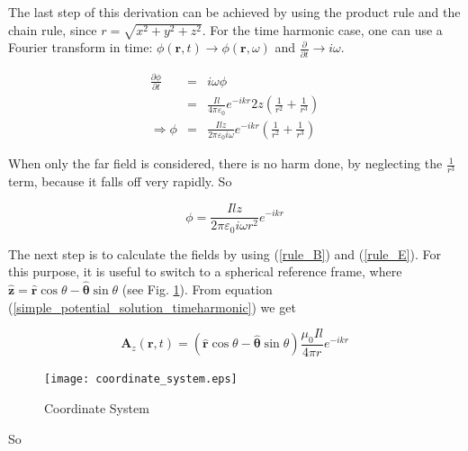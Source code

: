 \documentclass[a4paper,14pt]{extbook}
\begin{document}
The last step of this derivation can be achieved by using the product rule and the chain rule, since $r=\sqrt{x^2+y^2+z^2}$. For the time harmonic case, one can use a Fourier transform in time: $\phi (\mathbf{r},t) \rightarrow \phi (\mathbf{r},\omega)$ and $\frac{\partial }{\partial t} \rightarrow i \omega$.

\begin{eqnarray}
\frac{\partial \phi}{\partial t} &=& i \omega \phi\\
&=& \frac{ I l}{4 \pi \varepsilon_0} e^{-ikr } 2z \left( \frac{1}{r^2} + \frac{1}{r^3} \right)  \nonumber \\
\Rightarrow \phi &=& \frac{ I l z}{2 \pi \varepsilon_0 i \omega} e^{-ikr } \left( \frac{1}{r^2} + \frac{1}{r^3} \right) \label{solution_scalar_pot_hd}
\end{eqnarray}

When only the far field is considered, there is no harm done, by neglecting the $\frac{1}{r^3}$ term, because it falls off very rapidly. So

\begin{equation}\label{solution_scalar_pot_hd_ff}
\phi = \frac{ I l z}{2 \pi \varepsilon_0 i \omega r^2} e^{-ikr }
\end{equation}

The next step is to calculate the fields by using (\ref{rule_B}) and (\ref{rule_E}). For this purpose, it is useful to switch to a spherical reference frame, where $\mathbf{\hat{z}}=\mathbf{\hat{r}} \cos \theta - \mathbf{\hat{\theta}} \sin \theta$ (see Fig. \ref{fig_coordinate_system}). From equation (\ref{simple_potential_solution_timeharmonic}) we get

\begin{equation}\label{simple_potential_solution_timeharmonic_sherical_ref}
 \mathbf{A}_z (\mathbf{r},t) = (\mathbf{\hat{r}} \cos \theta - \mathbf{\hat{\theta}} \sin \theta) \frac{\mu_0 I l}{4 \pi r} e^{-ikr }
\end{equation}

\begin{center}
\begin{figure}
  \texttt{[image: coordinate\_system.eps]}\\
\caption{Coordinate System}\label{fig_coordinate_system}
\end{figure}
\end{center}
\newpage

So
\end{document}
